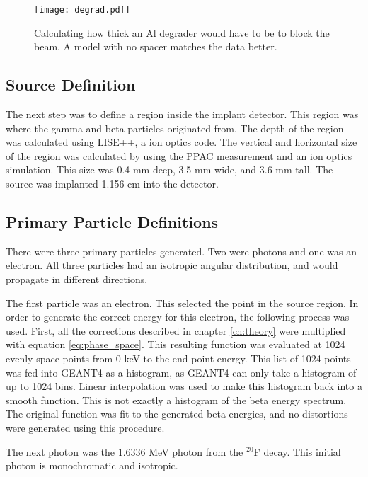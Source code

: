 \begin{figure}[!htb]
	\centerline{\texttt{[image: degrad.pdf]}}
	\caption{Calculating how thick an Al degrader would have to be to block the beam.
	 	 A model with no spacer matches the data better.}
	\label{fig:lisealcalc}
\end{figure}


\subsection{Source Definition}
The next step was to define a region inside the implant detector.
This region was where the gamma and beta particles originated from.
The depth of the region was calculated using LISE++, a ion optics code.
The vertical and horizontal size of the region was calculated by using the PPAC measurement and an ion optics simulation.
This size was 0.4 mm deep, 3.5 mm wide, and 3.6 mm tall.
The source was implanted 1.156 cm into the detector.

\subsection{Primary Particle Definitions}
There were three primary particles generated.
Two were photons and one was an electron.
All three particles had an isotropic angular distribution, and would propagate in different directions.

The first particle was an electron. 
This selected the point in the source region.
In order to generate the correct energy for this electron, the following process was used.
First, all the corrections described in chapter \ref{ch:theory} were multiplied with equation \ref{eq:phase_space}.
This resulting function was evaluated at 1024 evenly space points from 0 keV to the end point energy.
This list of 1024 points was fed into GEANT4 as a histogram, as GEANT4 can only take a histogram of up to 1024 bins. 
Linear interpolation was used to make this histogram back into a smooth function.
This is not exactly a histogram of the beta energy spectrum.
The original function was fit to the generated beta energies, and no distortions were generated using this procedure.

The next photon was the 1.6336 MeV photon from the $^{20}$F decay.
This initial photon is monochromatic and isotropic.

